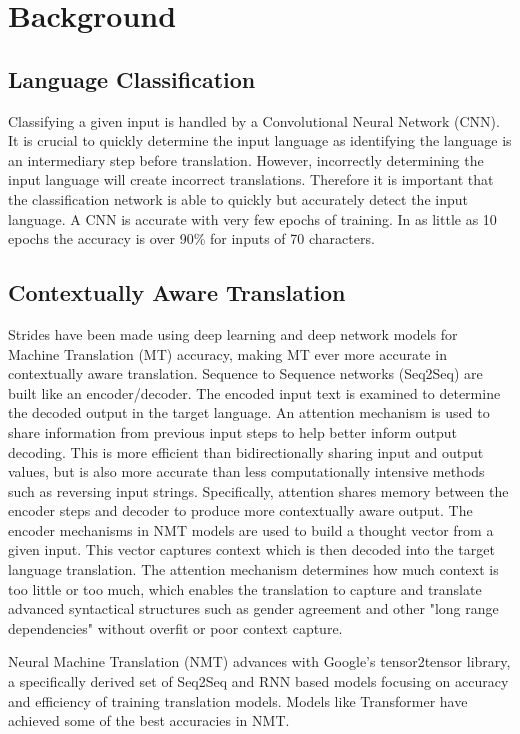 \documentclass[10pt,a4paper]{article}
\begin{document}
\section{Background}

\subsection{Language Classification}

  Classifying a given input is handled by a Convolutional Neural Network (CNN). It is crucial to quickly determine the input language as identifying the language is an intermediary step before translation. However, incorrectly determining the input language will create incorrect translations. Therefore it is important that the classification network is able to quickly but accurately detect the input language. A CNN is accurate with very few epochs of training. In as little as 10 epochs the accuracy is over 90\% for inputs of 70 characters.  

\subsection{Contextually Aware Translation}

  Strides have been made using deep learning and deep network models for Machine Translation (MT) accuracy, making MT ever more accurate in contextually aware translation. Sequence to Sequence networks (Seq2Seq) are built like an encoder/decoder. The encoded input text is examined to determine the decoded output in the target language. An attention mechanism is used to share information from previous input steps to help better inform output decoding. This is more efficient than bidirectionally sharing input and output values, but is also more accurate than less computationally intensive methods such as reversing input strings. Specifically, attention shares memory between the encoder steps and decoder to produce more contextually aware output. The encoder mechanisms in NMT models are used to build a thought vector from a given input. This vector captures context which is then decoded into the target language translation. The attention mechanism determines how much context is too little or too much, which enables the translation to capture and translate advanced syntactical structures such as gender agreement and other "long range dependencies" without overfit or poor context capture.

  Neural Machine Translation (NMT) advances with Google's tensor2tensor library, a specifically derived set of Seq2Seq and RNN based models focusing on accuracy and efficiency of training translation models. Models like Transformer have achieved some of the best accuracies in NMT. 
  
\end{document}
